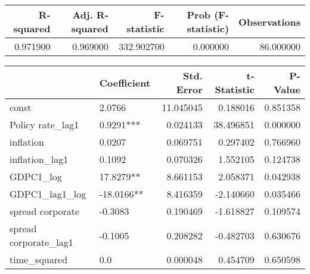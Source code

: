 \begin{tabular}{rrrrr}
\toprule
\textbf{R-squared} & \textbf{Adj. R-squared} & \textbf{F-statistic} & \textbf{Prob (F-statistic)} & \textbf{Observations} \\
\midrule
0.971900 & 0.969000 & 332.902700 & 0.000000 & 86.000000 \\
\bottomrule
\end{tabular}

\begin{tabular}{llrrr}
\toprule
 & \textbf{Coefficient} & \textbf{Std. Error} & \textbf{t-Statistic} & \textbf{P-Value} \\
\midrule
const & 2.0766 & 11.045045 & 0.188016 & 0.851358 \\
Policy rate_lag1 & 0.9291*** & 0.024133 & 38.496851 & 0.000000 \\
inflation & 0.0207 & 0.069751 & 0.297402 & 0.766960 \\
inflation_lag1 & 0.1092 & 0.070326 & 1.552105 & 0.124738 \\
GDPC1_log & 17.8279** & 8.661153 & 2.058371 & 0.042938 \\
GDPC1_lag1_log & -18.0166** & 8.416359 & -2.140660 & 0.035466 \\
spread corporate & -0.3083 & 0.190469 & -1.618827 & 0.109574 \\
spread corporate_lag1 & -0.1005 & 0.208282 & -0.482703 & 0.630676 \\
time_squared & 0.0 & 0.000048 & 0.454709 & 0.650598 \\
\bottomrule
\end{tabular}
